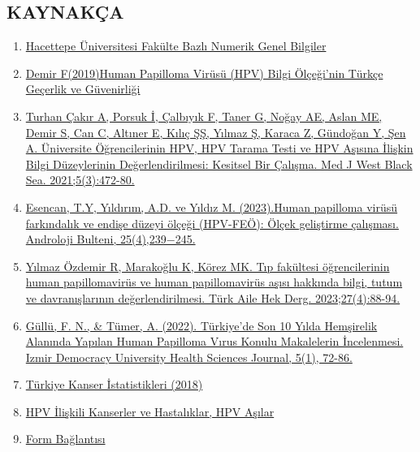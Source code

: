 \documentclass[turkish]{article}
\begin{document}
\clearpage
\begin{onecolumn}
\section{KAYNAKÇA}
    
\begin{enumerate}
   
    \item \href{https://www.hacettepe.edu.tr/ogretim/sayilarla_ogretim}{Hacettepe Üniversitesi Fakülte Bazlı Numerik Genel Bilgiler}
    \item\href{https://tez.yok.gov.tr/UlusalTezMerkezi/tezDetay.jsp?id=PbXEf_W5BPYbJWlM7wlVgQ&no=3YBI6ZjejEkzQxqlVU-UQw}{Demir F(2019)Human Papilloma Virüsü (HPV) Bilgi Ölçeği’nin Türkçe Geçerlik ve Güvenirliği}
    \item \href{https://doi.org/10.29058/mjwbs.974567}{Turhan Çakır A, Porsuk İ, Çalbıyık F, Taner G, Noğay AE, Aslan ME, Demir S, Can C, Altıner E, Kılıç ŞŞ, Yılmaz Ş, Karaca Z, Gündoğan Y, Şen A. Üniversite Öğrencilerinin HPV, HPV Tarama Testi ve HPV Aşısına İlişkin Bilgi Düzeylerinin Değerlendirilmesi: Kesitsel Bir Çalışma. Med J West Black Sea. 2021;5(3):472-80. }
    \item \href{https://doi.org/10.24898/tandro.2023.75875}{Esencan, T.Y,  Yıldırım, A.D. ve Yıldız M. (2023).Human papilloma virüsü farkındalık ve endişe düzeyi ölçeği (HPV-FEÖ): Ölçek geliştirme çalışması. Androloji Bulteni, 25(4),239−245.}
    \item \href{https://doi.org/10.54308/tahd.2023.96630}{Yılmaz Özdemir R, Marakoğlu K, Körez MK. Tıp fakültesi öğrencilerinin human papillomavirüs ve human papillomavirüs aşısı hakkında bilgi, tutum ve davranışlarının değerlendirilmesi. Türk Aile Hek Derg. 2023;27(4):88-94.}
    \item \href{https://doi.org/10.52538/iduhes.1021327}{Güllü, F. N., & Tümer, A. (2022). Türkiye’de Son 10 Yılda Hemşirelik Alanında Yapılan Human Papilloma Vırus Konulu Makalelerin İncelenmesi. Izmir Democracy University Health Sciences Journal, 5(1), 72-86. }
     \item \href{https://hsgm.saglik.gov.tr/depo/birimler/kanser-db/Dokumanlar/Istatistikler/Kanser_Rapor_2018.pdf#:~:text=URL%3A%20https%3A%2F%2Fhsgm.saglik.gov.tr%2Fdepo%2Fbirimler%2Fkanser}{Türkiye Kanser İstatistikleri (2018)}
    \item \href{https://www.klimik.org.tr/wp-content/uploads/2023/04/Emre.Koc_-Uydu-Sunumu_KLIMIK-14.03.2023_compressed.pdf}{HPV İlişkili Kanserler ve Hastalıklar, HPV Aşılar}
    \item \href{https://docs.google.com/forms/d/e/1FAIpQLSdxOtLE8ORo710bd4GC0ps63wlUJTkin91RevpusbA8a_pK_Q/viewform}{Form Bağlantısı} \label{form}
\end{enumerate}
\end{onecolumn}
\end{document}
